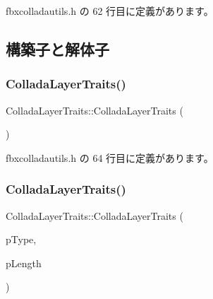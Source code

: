  fbxcolladautils.\+h の 62 行目に定義があります。



\subsection{構築子と解体子}
\mbox{\label{struct_collada_layer_traits_a53f06a4cc0a322c53a835f89bca19caf}} 
\subsubsection{\texorpdfstring{Collada\+Layer\+Traits()}{ColladaLayerTraits()}\hspace{0.1cm}{\footnotesize\ttfamily [1/2]}}
{\footnotesize\ttfamily Collada\+Layer\+Traits\+::\+Collada\+Layer\+Traits (\begin{DoxyParamCaption}{ }\end{DoxyParamCaption})\hspace{0.3cm}{\ttfamily [inline]}}



 fbxcolladautils.\+h の 64 行目に定義があります。

\mbox{\label{struct_collada_layer_traits_a823980f2de7a3b074c41add0b972fb78}} 
\subsubsection{\texorpdfstring{Collada\+Layer\+Traits()}{ColladaLayerTraits()}\hspace{0.1cm}{\footnotesize\ttfamily [2/2]}}
{\footnotesize\ttfamily Collada\+Layer\+Traits\+::\+Collada\+Layer\+Traits (\begin{DoxyParamCaption}\item[{\hyperlink{class_fbx_layer_element_a8c95c5cd880b56c776acd379bd86f42c}{Fbx\+Layer\+Element\+::\+E\+Type}}]{p\+Type,  }\item[{int}]{p\+Length }\end{DoxyParamCaption})\hspace{0.3cm}{\ttfamily [inline]}}



